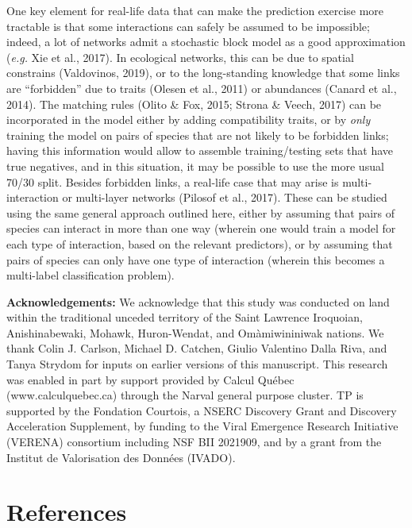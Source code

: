 \documentclass[11pt]{article}
\begin{document}
One key element for real-life data that can make the prediction exercise
more tractable is that some interactions can safely be assumed to be
impossible; indeed, a lot of networks admit a stochastic block model as
a good approximation (\emph{e.g.} Xie et al., 2017). In ecological
networks, this can be due to spatial constrains (Valdovinos, 2019), or
to the long-standing knowledge that some links are ``forbidden'' due to
traits (Olesen et al., 2011) or abundances (Canard et al., 2014). The
matching rules (Olito \& Fox, 2015; Strona \& Veech, 2017) can be
incorporated in the model either by adding compatibility traits, or by
\emph{only} training the model on pairs of species that are not likely
to be forbidden links; having this information would allow to assemble
training/testing sets that have true negatives, and in this situation,
it may be possible to use the more usual 70/30 split. Besides forbidden
links, a real-life case that may arise is multi-interaction or
multi-layer networks (Pilosof et al., 2017). These can be studied using
the same general approach outlined here, either by assuming that pairs
of species can interact in more than one way (wherein one would train a
model for each type of interaction, based on the relevant predictors),
or by assuming that pairs of species can only have one type of
interaction (wherein this becomes a multi-label classification problem).

\textbf{Acknowledgements:} We acknowledge that this study was conducted
on land within the traditional unceded territory of the Saint Lawrence
Iroquoian, Anishinabewaki, Mohawk, Huron-Wendat, and Omàmiwininiwak
nations. We thank Colin J. Carlson, Michael D. Catchen, Giulio Valentino
Dalla Riva, and Tanya Strydom for inputs on earlier versions of this
manuscript. This research was enabled in part by support provided by
Calcul Québec (www.calculquebec.ca) through the Narval general purpose
cluster. TP is supported by the Fondation Courtois, a NSERC Discovery
Grant and Discovery Acceleration Supplement, by funding to the Viral
Emergence Research Initiative (VERENA) consortium including NSF BII
2021909, and by a grant from the Institut de Valorisation des Données
(IVADO).

\hypertarget{references}{%
\section*{References}\label{references}}
\end{document}
